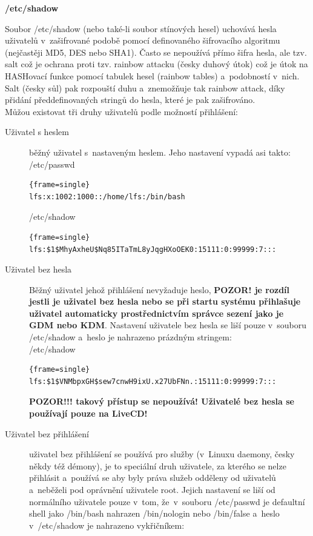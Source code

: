 \documentclass[a4paper,12pt]{article}
\newcommand{\nadpis}[1]{%
	\vspace{4 mm}
	\textbf{#1}\\
	\vspace{4 mm}
	}
\renewcommand{\b}[1]{\textbf{#1}} %
\newenvironment{codeframe}{%
  \begin{Sbox} 
    \begin{minipage} 
      {\columnwidth-\leftmargin-\rightmargin-2\fboxsep-2\fboxrule-4pt} 
}{%

  \end{minipage} 
  \end{Sbox} 
  \begin{center} 
    \fcolorbox{black}{codeback}{\TheSbox} 
  \end{center} 
}
\begin{document}
\nadpis{/etc/shadow}

Soubor /etc/shadow (nebo také-li soubor stínových hesel) uchovává hesla uživatelů v~zašifrované podobě pomocí definovaného šifrovacího algoritmu (nejčastěji MD5, DES nebo SHA1). Často se nepoužívá přímo šifra hesla, ale tzv. salt což je ochrana proti tzv. rainbow attacku (česky duhový útok) což je útok na HASHovací funkce pomocí tabulek hesel (rainbow tables) a~podobností v~nich. Salt (česky sůl) pak rozpouští duhu a~znemožňuje tak rainbow attack, díky přidání předdefinovaných stringů do hesla, které je pak zašifrováno.~\cite{rubyOnRailTutorial}\\

Můžou existovat tři druhy uživatelů podle možností přihlášení:
\begin{description}
 \item[Uživatel s heslem] běžný uživatel s~nastaveným heslem. Jeho nastavení vypadá asi takto:\\
/etc/passwd
    \begin{codeframe}
      \begin{Verbatim}{frame=single}
lfs:x:1002:1000::/home/lfs:/bin/bash
\end{Verbatim} 
    \end{codeframe}
/etc/shadow
    \begin{codeframe}
      \begin{Verbatim}{frame=single}
lfs:$1$MhyAxheU$Nq85ITaTmL8yJqgHXoOEK0:15111:0:99999:7:::
\end{Verbatim} 
    \end{codeframe}
 \item[Uživatel bez hesla] Běžný uživatel jehož přihlášení nevyžaduje heslo, \b{POZOR! je rozdíl jestli je uživatel bez hesla nebo se při startu systému přihlašuje uživatel automaticky prostřednictvím správce sezení jako je GDM nebo KDM}. Nastavení uživatele bez hesla se liší pouze v~souboru /etc/shadow a~heslo je nahrazeno prázdným stringem:\\
/etc/shadow
    \begin{codeframe}
      \begin{Verbatim}{frame=single}
lfs:$1$VNMbpxGH$sew7cnwH9ixU.x27UbFNn.:15111:0:99999:7:::
\end{Verbatim} 
    \end{codeframe}
\b{POZOR!!! takový přístup se nepoužívá! Uživatelé bez hesla se používají pouze na LiveCD!}
 \item[Uživatel bez přihlášení] uživatel bez přihlášení se používá pro služby (v~Linuxu daemony, česky někdy též démony), je to speciální druh uživatele, za kterého se nelze přihlásit a~používá se aby byly práva služeb odděleny od uživatelů a~neběželi pod oprávnění uživatele root. Jejich nastavení se liší od normálního uživatele pouze v~tom, že~v~souboru /etc/passwd je defaultní shell jako /bin/bash nahrazen /bin/nologin nebo /bin/false a~heslo v~/etc/shadow je nahrazeno vykřičníkem:\\

\end{description}
\end{document}
